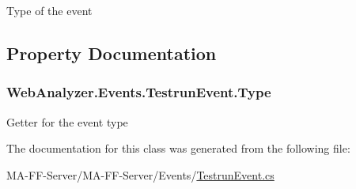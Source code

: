 Type of the event 



\subsection{Property Documentation}
\hypertarget{class_web_analyzer_1_1_events_1_1_testrun_event_a2b00817b90c600d38c12f6dc1e1ebc3c}{}
\subsubsection[{Type}]{ Web\+Analyzer.\+Events.\+Testrun\+Event.\+Type\hspace{0.3cm}{\ttfamily [get]}}\label{class_web_analyzer_1_1_events_1_1_testrun_event_a2b00817b90c600d38c12f6dc1e1ebc3c}


Getter for the event type 



The documentation for this class was generated from the following file\+:\begin{DoxyCompactItemize}
\item 
M\+A-\/\+F\+F-\/\+Server/\+M\+A-\/\+F\+F-\/\+Server/\+Events/\hyperlink{_testrun_event_8cs}{Testrun\+Event.\+cs}\end{DoxyCompactItemize}
